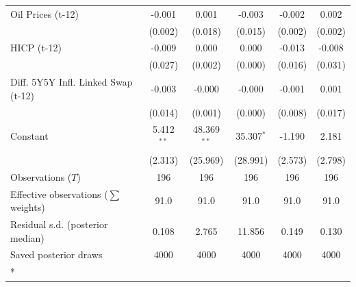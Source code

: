 \begin{longtable}[t]{lccccc}
Oil Prices (t-12) & -0.001 & 0.001 & -0.003 & -0.002 & 0.002\\
 & (0.002) & (0.018) & (0.015) & (0.002) & (0.002)\\
HICP (t-12) & -0.009 & 0.000 & 0.000 & -0.013 & -0.008\\
 & (0.027) & (0.002) & (0.000) & (0.016) & (0.031)\\
Diff. 5Y5Y Infl. Linked Swap (t-12) & -0.003 & -0.000 & -0.000 & -0.001 & 0.001\\
 & (0.014) & (0.001) & (0.000) & (0.008) & (0.017)\\
Constant & 5.412$^{**}$ & 48.369$^{**}$ & 35.307$^{*}$ & -1.190 & 2.181\\
 & (2.313) & (25.969) & (28.991) & (2.573) & (2.798)\\
\midrule
Observations ($T$) & 196 & 196 & 196 & 196 & 196\\
Effective observations ($\sum$ weights) & 91.0 & 91.0 & 91.0 & 91.0 & 91.0\\
Residual s.d. (posterior median) & 0.108 & 2.765 & 11.856 & 0.149 & 0.130\\
Saved posterior draws & 4000 & 4000 & 4000 & 4000 & 4000\\*
\end{longtable}
\endgroup{}

\begingroup\fontsize{7}{9}\selectfont

